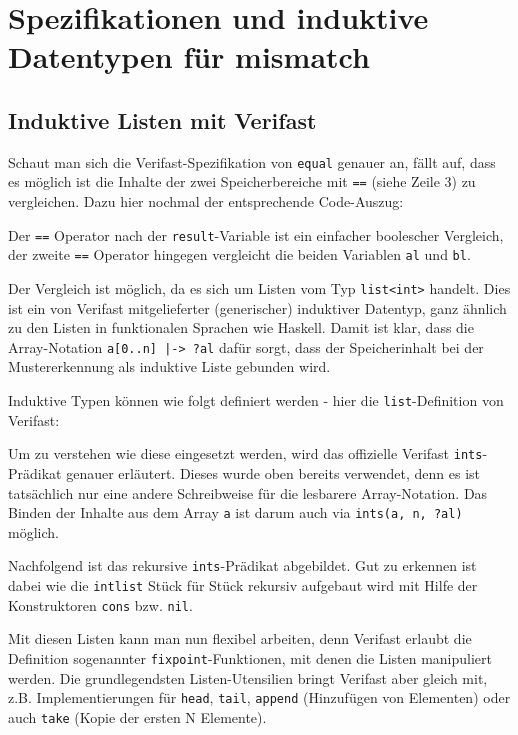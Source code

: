 ﻿\section{Spezifikationen und induktive Datentypen für mismatch}
\label{sec:induktive-datentypen}
\subsection{Induktive Listen mit Verifast}

Schaut man sich die Verifast-Spezifikation von \lstinline{equal} genauer an, fällt auf, dass es 
möglich ist die Inhalte der zwei Speicherbereiche mit \lstinline{==} (siehe Zeile 3) zu vergleichen. 
Dazu hier nochmal der entsprechende Code-Auszug:



Der \lstinline{==} Operator nach der \lstinline{result}-Variable ist ein einfacher boolescher Vergleich,
der zweite \lstinline{==} Operator hingegen vergleicht die beiden Variablen \lstinline{al} und \lstinline{bl}.

Der Vergleich ist möglich, da es sich um Listen vom Typ \lstinline{list<int>} handelt. Dies ist ein
von Verifast mitgelieferter (generischer) induktiver Datentyp, ganz ähnlich zu den Listen in funktionalen 
Sprachen wie Haskell. Damit ist klar, dass die Array-Notation \lstinline{a[0..n] |-> ?al} dafür sorgt, 
dass der Speicherinhalt bei der Mustererkennung als induktive Liste gebunden wird.

Induktive Typen können wie folgt definiert werden - hier die \lstinline{list}-Definition von Verifast:



Um zu verstehen wie diese eingesetzt werden, wird das offizielle Verifast \lstinline{ints}-Prädikat genauer
erläutert. Dieses wurde oben bereits verwendet, denn es ist tatsächlich nur eine andere Schreibweise für die 
lesbarere Array-Notation. Das Binden der Inhalte aus dem Array \lstinline{a} ist darum auch via 
\lstinline{ints(a, n, ?al)} möglich.

Nachfolgend ist das rekursive \lstinline{ints}-Prädikat abgebildet. Gut zu erkennen ist dabei
wie die \lstinline{intlist} Stück für Stück rekursiv aufgebaut wird mit Hilfe der Konstruktoren
\lstinline{cons} bzw. \lstinline{nil}.



Mit diesen Listen kann man nun flexibel arbeiten, denn Verifast erlaubt die Definition sogenannter
\lstinline{fixpoint}-Funktionen, mit denen die Listen manipuliert werden. Die grundlegendsten
Listen-Utensilien bringt Verifast aber gleich mit, z.B. Implementierungen für \lstinline{head}, 
\lstinline{tail}, \lstinline{append} (Hinzufügen von Elementen) oder auch \lstinline{take} 
(Kopie der ersten N Elemente).



